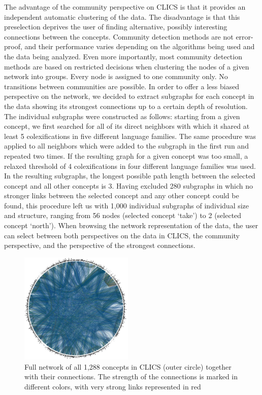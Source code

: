 The advantage of the community perspective on CLICS is that it provides an independent automatic
clustering of the data. The disadvantage is that this preselection deprives the user of finding
alternative, possibly interesting connections between the concepts. Community detection methods are not
error-proof, and their performance varies depending on the algorithms being used and the data being analyzed.
Even more importantly, most community detection methods are based on restricted decisions when
clustering the nodes of a given network into groups. Every node is assigned to one community only.
No transitions between communities are possible. In order to offer a less biased perspective on the
network, we decided to extract subgraphs for each concept in the data showing its strongest
connections up to a certain depth of resolution. The individual subgraphs were constructed as follows: starting
from a given concept, we first searched for all of its direct neighbors with which it shared at
least 5 colexifications in five different language families. The same procedure was applied to all neighbors
which were added to the subgraph in the first run and repeated two times. If the resulting graph for a given concept was
too small, a relaxed threshold of 4 colexifications in four different language families was used.  
In the resulting subgraphs, the longest possible path length between the selected concept and all other
concepts is 3. Having excluded 280 subgraphs in which no stronger links between the selected concept and any
other concept could be found, this procedure left us with 1,000 individual subgraphs of individual
size and structure, ranging from 56 nodes (selected concept `take') to 2 (selected concept `north'). 
When browsing the network representation of the data, the user can select between both perspectives
on the data in CLICS, the community perspective, and the perspective of the strongest connections.

\begin{figure}[b]
    \centering
   \includegraphics[width=0.48\textwidth]{img/completeNetworkLabels.jpg}
    \caption{Full network of all 1,288 concepts in CLICS (outer circle) together with their connections. The strength of the connections is marked in different colors, with very strong links represented in red}
    \label{fig:clics_full}
\end{figure}


